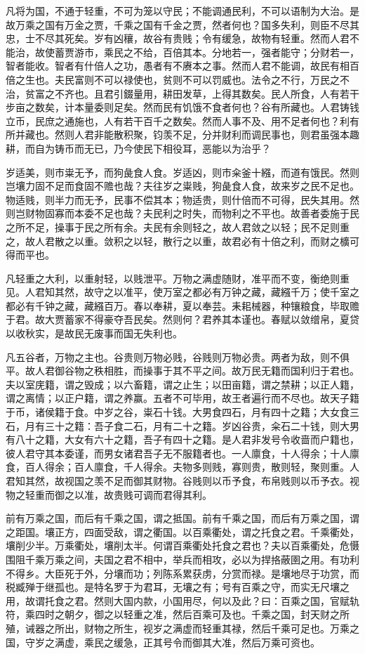 \documentclass[]{article}
\begin{document}
凡将为国，不通于轻重，不可为笼以守民；不能调通民利，不可以语制为大治。是故万乘之国有万金之贾，千乘之国有千金之贾，然者何也？国多失利，则臣不尽其忠，士不尽其死矣。岁有凶穰，故谷有贵贱；令有缓急，故物有轻重。然而人君不能治，故使蓄贾游市，乘民之不给，百倍其本。分地若一，强者能守；分财若一，智者能收。智者有什倍人之功，愚者有不赓本之事。然而人君不能调，故民有相百倍之生也。夫民富则不可以禄使也，贫则不可以罚威也。法令之不行，万民之不治，贫富之不齐也。且君引錣量用，耕田发草，上得其数矣。民人所食，人有若干步亩之数矣，计本量委则足矣。然而民有饥饿不食者何也？谷有所藏也。人君铸钱立币，民庶之通施也，人有若干百千之数矣。然而人事不及、用不足者何也？利有所并藏也。然则人君非能散积聚，钧羡不足，分并财利而调民事也，则君虽强本趣耕，而自为铸币而无已，乃今使民下相役耳，恶能以为治乎？

岁适美，则市粜无予，而狗彘食人食。岁适凶，则市籴釜十繦，而道有饿民。然则岂壤力固不足而食固不赡也哉？夫往岁之粜贱，狗彘食人食，故来岁之民不足也。物适贱，则半力而无予，民事不偿其本；物适贵，则什倍而不可得，民失其用。然则岂财物固寡而本委不足也哉？夫民利之时失，而物利之不平也。故善者委施于民之所不足，操事于民之所有余。夫民有余则轻之，故人君敛之以轻；民不足则重之，故人君散之以重。敛积之以轻，散行之以重，故君必有十倍之利，而财之櫎可得而平也。

凡轻重之大利，以重射轻，以贱泄平。万物之满虚随财，准平而不变，衡绝则重见。人君知其然，故守之以准平，使万室之都必有万钟之藏，藏繦千万；使千室之都必有千钟之藏，藏繦百万。春以奉耕，夏以奉芸。耒耜械器，种镶粮食，毕取赡于君。故大贾蓄家不得豪夺吾民矣。然则何？君养其本谨也。春赋以敛缯帛，夏贷以收秋实，是故民无废事而国无失利也。

凡五谷者，万物之主也。谷贵则万物必贱，谷贱则万物必贵。两者为敌，则不俱平。故人君御谷物之秩相胜，而操事于其不平之间。故万民无籍而国利归于君也。夫以室庑籍，谓之毁成；以六畜籍，谓之止生；以田亩籍，谓之禁耕；以正人籍，谓之离情；以正户籍，谓之养赢。五者不可毕用，故王者遍行而不尽也。故天子籍于币，诸侯籍于食。中岁之谷，粜石十钱。大男食四石，月有四十之籍；大女食三石，月有三十之籍：吾子食二石，月有二十之籍。岁凶谷贵，籴石二十钱，则大男有八十之籍，大女有六十之籍，吾子有四十之籍。是人君非发号令收啬而户籍也，彼人君守其本委谨，而男女诸君吾子无不服籍者也。一人廪食，十人得余；十人廪食，百人得余；百人廪食，千人得余。夫物多则贱，寡则贵，散则轻，聚则重。人君知其然，故视国之羡不足而御其财物。谷贱则以币予食，布帛贱则以币予衣。视物之轻重而御之以准，故贵贱可调而君得其利。

前有万乘之国，而后有千乘之国，谓之抵国。前有千乘之国，而后有万乘之国，谓之距国。壤正方，四面受敌，谓之衢国。以百乘衢处，谓之托食之君。千乘衢处，壤削少半。万乘衢处，壤削太半。何谓百乘衢处托食之君也？夫以百乘衢处，危慑围阻千乘万乘之间，夫国之君不相中，举兵而相攻，必以为捍挌蔽圉之用。有功利不得乡。大臣死于外，分壤而功；列陈系累获虏，分赏而禄。是壤地尽于功赏，而税臧殚于继孤也。是特名罗于为君耳，无壤之有；号有百乘之守，而实无尺壤之用，故谓托食之君。然则大国内款，小国用尽，何以及此？曰：百乘之国，官赋轨符，乘四时之朝夕，御之以轻重之准，然后百乘可及也。千乘之国，封天财之所殖，诫器之所出，财物之所生，视岁之满虚而轻重其禄，然后千乘可足也。万乘之国，守岁之满虚，乘民之缓急，正其号令而御其大准，然后万乘可资也。
\end{document}
